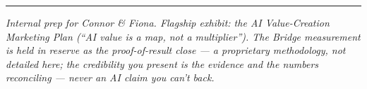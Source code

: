 \documentclass[11pt]{article}
\begin{document}
\vspace{6pt}\hrule\vspace{5pt}
{\footnotesize\itshape Internal prep for Connor \& Fiona. Flagship exhibit: the AI Value-Creation
Marketing Plan (``AI value is a map, not a multiplier''). The Bridge measurement is held in
reserve as the proof-of-result close --- a proprietary methodology, not detailed here; the
credibility you present is the evidence and the numbers reconciling --- never an AI claim you
can't back.}
\end{document}
